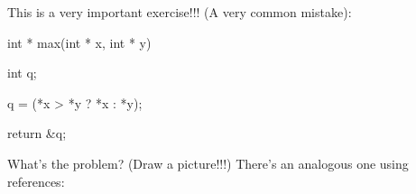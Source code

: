 This is a very important exercise!!! (A very common mistake):



\begin{consolethree}[escapeinside=||]

int * max(int * x, int * y)

{

    int q;

    q = (*x > *y ? *x : *y);

    return &q;

}

\end{consolethree}

What's the problem? (Draw a picture!!!) There's an analogous one using references:

